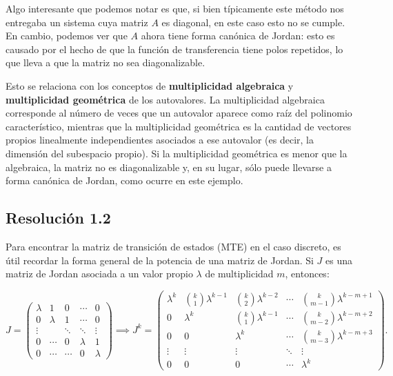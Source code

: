 \documentclass[
  11pt,
  letterpaper,
   addpoints,
  answers
  ]{exam}
\begin{document}
\begin{questions}
\begin{solution}
Algo interesante que podemos notar es que, si bien típicamente este método nos entregaba un sistema cuya matriz $A$ es diagonal, en este caso esto no se cumple. En cambio, podemos ver que $A$ ahora tiene forma canónica de Jordan: esto es causado por el hecho de que la función de transferencia tiene polos repetidos, lo que lleva a que la matriz no sea diagonalizable.

Esto se relaciona con los conceptos de \textbf{multiplicidad algebraica} y \textbf{multiplicidad geométrica} de los autovalores. La multiplicidad algebraica corresponde al número de veces que un autovalor aparece como raíz del polinomio característico, mientras que la multiplicidad geométrica es la cantidad de vectores propios linealmente independientes asociados a ese autovalor (es decir, la dimensión del subespacio propio). Si la multiplicidad geométrica es menor que la algebraica, la matriz no es diagonalizable y, en su lugar, sólo puede llevarse a forma canónica de Jordan, como ocurre en este ejemplo.


\subsection*{Resolución 1.2}

Para encontrar la matriz de transición de estados (MTE) en el caso discreto, es útil recordar la forma general de la potencia de una matriz de Jordan. Si $J$ es una matriz de Jordan asociada a un valor propio $\lambda$ de multiplicidad $m$, entonces:

\[
J=\begin{pmatrix}
\lambda & 1 & 0 & \cdots & 0\\
0 & \lambda & 1 & \cdots & 0\\
\vdots & & \ddots & \ddots & \vdots\\
0 & \cdots & 0 & \lambda & 1\\
0 & \cdots & \cdots & 0 & \lambda
\end{pmatrix}
\implies
J^{k}=\begin{pmatrix}
\lambda^{k} & \binom{k}{1}\lambda^{k-1} & \binom{k}{2}\lambda^{k-2} & \cdots & \binom{k}{m-1}\lambda^{k-m+1}\\
0 & \lambda^{k} & \binom{k}{1}\lambda^{k-1} & \cdots & \binom{k}{m-2}\lambda^{k-m+2}\\
0 & 0 & \lambda^{k} & \cdots & \binom{k}{m-3}\lambda^{k-m+3}\\
\vdots & \vdots & \vdots & \ddots & \vdots\\
0 & 0 & 0 & \cdots & \lambda^{k}
\end{pmatrix}.
\]


\end{solution}
\end{questions}
\end{document}
